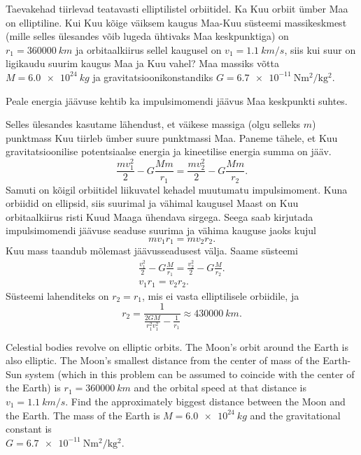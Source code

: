 
Taevakehad tiirlevad teatavasti elliptilistel orbiitidel. Ka Kuu orbiit ümber Maa on elliptiline. Kui Kuu kõige väiksem kaugus Maa-Kuu süsteemi massikeskmest (mille selles ülesandes võib lugeda ühtivaks Maa keskpunktiga) on $r_{1}=\SI{360000}{km}$ ja orbitaalkiirus sellel kaugusel on $v_1=\SI{1.1}{km/s}$, siis kui suur on ligikaudu suurim kaugus Maa ja Kuu vahel? Maa massiks võtta $M=\SI{6.0e24}{kg}$ ja gravitatsioonikonstandiks $G=\SI{6.7e-11}{\newton\metre\squared\per\kilo\gram\squared}$.

\hint
Peale energia jäävuse kehtib ka impulsimomendi jäävus Maa keskpunkti suhtes.

\solu
Selles ülesandes kasutame lähendust, et väikese massiga (olgu selleks $m$) punktmass Kuu tiirleb ümber suure punktmassi Maa. Paneme tähele, et Kuu gravitatsioonilise potentsiaalse energia ja kineetilise energia summa on jääv.
$$
\frac{mv_1^2}{2}-G\frac{Mm}{r_1}=\frac{mv_2^2}{2}-G\frac{Mm}{r_2}.
$$
Samuti on kõigil orbiitidel liikuvatel kehadel muutumatu impulsimoment. Kuna orbiidid on ellipsid, siis suurimal ja vähimal kaugusel Maast on Kuu orbitaalkiirus risti Kuud Maaga ühendava sirgega. Seega saab kirjutada impulsimomendi jäävuse seaduse suurima ja vähima kauguse jaoks kujul
$$
mv_1r_1=mv_2r_2.
$$
Kuu mass taandub mõlemast jäävusseadusest välja. Saame süsteemi
$$
\begin{array}{c} 
\frac{v_1^2}{2}-G\frac{M}{r_1}=\frac{v_2^2}{2}-G\frac{M}{r_2}.\\
v_1r_1=v_2r_2.
\end{array}
$$
Süsteemi lahenditeks on $r_2=r_1$, mis ei vasta elliptilisele orbiidile, ja $$r_2=\frac{1}{\frac{2GM}{r_1^2v_1^2}-\frac{1}{r_1}}\approx\SI{430000}{km}.$$

Celestial bodies revolve on elliptic orbits. The Moon’s orbit around the Earth is also elliptic. The Moon’s smallest distance from the center of mass of the Earth-Sun system (which in this problem can be assumed to coincide with the center of the Earth) is $r_{1}=\SI{360000}{km}$ and the orbital speed at that distance is $v_1=\SI{1.1}{km/s}$. Find the approximately biggest distance between the Moon and the Earth. The mass of the Earth is $M=\SI{6.0e24}{kg}$ and the gravitational constant is\\ $G=\SI{6.7e-11}{\newton\metre\squared\per\kilo\gram\squared}$.


